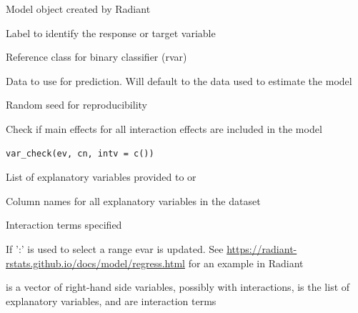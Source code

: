 \documentclass[a4paper]{book}
\begin{document}
%
\begin{Arguments}
\begin{ldescription}
\item[\code{object}] Model object created by Radiant

\item[\code{rvar}] Label to identify the response or target variable

\item[\code{lev}] Reference class for binary classifier (rvar)

\item[\code{data}] Data to use for prediction. Will default to the data used to estimate the model

\item[\code{seed}] Random seed for reproducibility
\end{ldescription}
\end{Arguments}
%
\begin{Description}
Check if main effects for all interaction effects are included in the model
\end{Description}
%
\begin{Usage}
\begin{verbatim}
var_check(ev, cn, intv = c())
\end{verbatim}
\end{Usage}
%
\begin{Arguments}
\begin{ldescription}
\item[\code{ev}] List of explanatory variables provided to  or 

\item[\code{cn}] Column names for all explanatory variables in the dataset

\item[\code{intv}] Interaction terms specified
\end{ldescription}
\end{Arguments}
%
\begin{Details}
If ':' is used to select a range evar is updated. See \url{https://radiant-rstats.github.io/docs/model/regress.html} for an example in Radiant
\end{Details}
%
\begin{Value}
 is a vector of right-hand side variables, possibly with interactions,  is the list of explanatory variables, and  are interaction terms
\end{Value}
\end{document}
